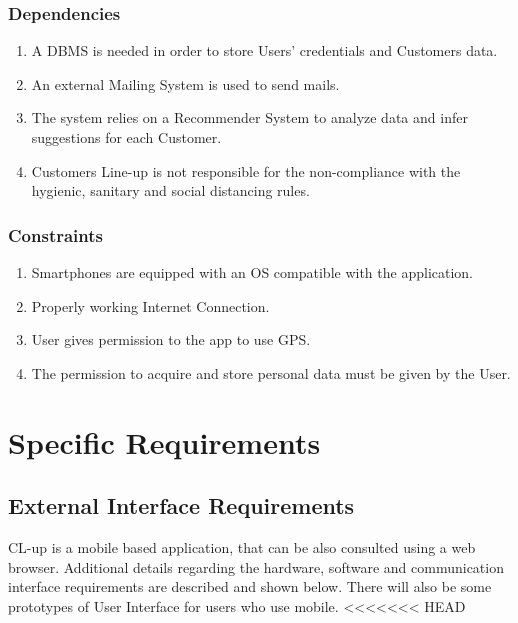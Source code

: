 \documentclass[a4paper, 12pt, oneside]{article}
\begin{document}
\subsubsection{Dependencies}
\begin{enumerate}
    \item A DBMS is needed in order to store Users' credentials and Customers data.
    \item An external Mailing System is used to send mails.
    \item The system relies on a Recommender System to analyze data and infer suggestions for each Customer.
    \item Customers Line-up is not responsible for the non-compliance with the hygienic, sanitary and social distancing rules.
    
\end{enumerate}
\subsubsection{Constraints}
\begin{enumerate}
    \item Smartphones are equipped with an OS compatible with the application.
    \item Properly working Internet Connection.
    \item User gives permission to the app to use GPS.
    \item The permission to acquire and store personal data must be given by the User.
\end{enumerate}
\newpage
\section{Specific Requirements}
\label{specificRequirements}
\subsection{External Interface Requirements}
CL-up is a mobile based application, that can be also consulted using a web browser. Additional details regarding the hardware, software and communication interface requirements are described and shown below. There will also be some prototypes of User Interface for users who use mobile.
<<<<<<< HEAD
\end{document}
